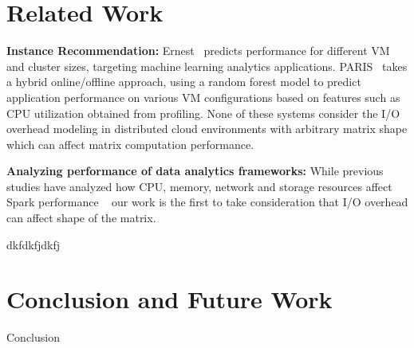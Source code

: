 \documentclass[10pt, conference, compsocconf]{IEEEtran}
\begin{document}
\section{Related Work}\label{sec:relatedwork}
\textbf{Instance Recommendation:} Ernest~\cite{venkataraman2016ernest} predicts performance for different VM and cluster sizes, targeting machine learning analytics applications. PARIS~\cite{Yadwadkar:2017:SBV:3127479.3131614} takes a hybrid online/offline approach, using a random forest model to predict application performance on various VM configurations based on features such as CPU utilization obtained from profiling. None of these systems consider the I/O overhead modeling in distributed cloud environments with arbitrary matrix shape which can affect matrix computation performance. 

\textbf{Analyzing performance of data analytics frameworks:} While previous studies have analyzed how CPU, memory, network and storage resources affect Spark performance ~\cite{196352,li2014tachyon,ousterhout2015making} our work is the first to take consideration that I/O overhead can affect shape of the matrix. 

dkfdkfjdkfj

\section{Conclusion and Future Work}
Conclusion~\cite{tr-spark}




\end{document}

